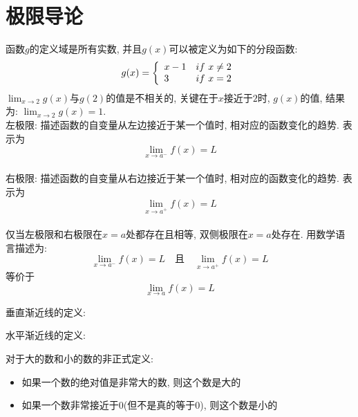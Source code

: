 \chapter{极限导论}
\phantom{空格}函数$g$的定义域是所有实数, 并且$g(x)$可以被定义为如下的分段函数:\\
\[
	g(x)=\left\{
	\begin{array}{l l}
		x-1 & if\ x\neq2\\
		3 & if\ x=2
	\end{array}
	\right.
\]
$\displaystyle\lim_{x\to2}g(x)$与$g(2)$的值是不相关的, 关键在于$x$接近于$2$时, $g(x)$的值, 结果为: $\displaystyle\lim_{x\to2}g(x)=1$.\\
\phantom{空格}左极限: 描述函数的自变量从左边接近于某一个值时, 相对应的函数变化的趋势. 表示为
\[\lim_{x\to a^-}f(x)=L\]\\
\phantom{空格}右极限: 描述函数的自变量从右边接近于某一个值时, 相对应的函数变化的趋势. 表示为
\[\lim_{x\to a^+}f(x)=L\]\\
仅当左极限和右极限在$x=a$处都存在且相等, 双侧极限在$x=a$处存在. 用数学语言描述为:\\
\[\lim_{x\to a^-}f(x)=L\quad\text{且}\quad\lim_{x\to a^+}f(x)=L\]
等价于
\[\lim_{x\to a}f(x)=L\]

垂直渐近线的定义:
{\par\centering
{}
\par}\vspace{4ex}

水平渐近线的定义:
{\par\centering
{}
\par}\vspace{4ex}

对于大的数和小的数的非正式定义:
\begin{itemize}
		\item 如果一个数的绝对值是非常大的数, 则这个数是大的
		\item 如果一个数非常接近于0(但不是真的等于0), 则这个数是小的
\end{itemize}\vspace{4ex}

